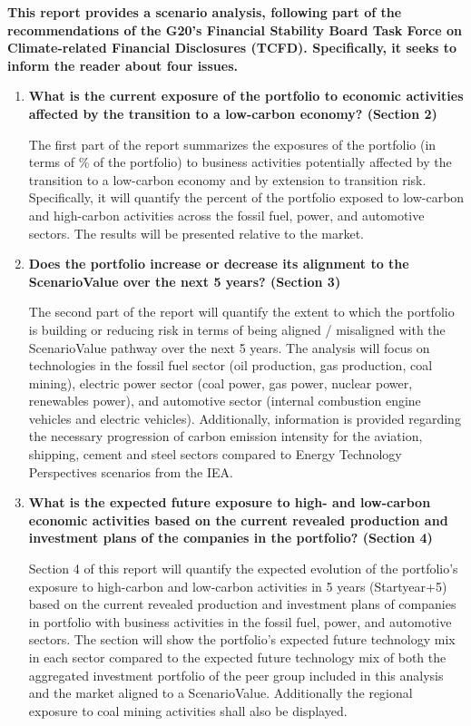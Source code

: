 \documentclass[10pt,table]{article}\usepackage[]{graphicx}\usepackage[]{color}
\begin{document}
	\begin{multicols}{2}

		\textbf{This report provides a scenario analysis, following part of the recommendations of the G20's Financial Stability Board Task Force on Climate-related Financial Disclosures (TCFD). Specifically, it seeks to inform the reader about four issues.}

		\begin{enumerate}
			\item{\textbf{What is the current exposure of the portfolio to economic activities affected by the transition to a low-carbon economy? (Section 2) }
			}

			The first part of the report summarizes the exposures of the portfolio (in terms of \% of the portfolio) to business activities potentially affected by the transition to a low-carbon economy and by extension to transition risk. Specifically, it will quantify the percent of the portfolio exposed to low-carbon and high-carbon activities across the fossil fuel, power, and automotive sectors. The results will be presented relative to the market.

			\item{\textbf{Does the portfolio increase or decrease its alignment to the ScenarioValue over the next 5 years? (Section 3)}
			}

			The second part of the report will quantify the extent to which the portfolio is building or reducing risk in terms of being aligned / misaligned with the ScenarioValue pathway over the next 5 years. The analysis will focus on technologies in the fossil fuel sector (oil production, gas production, coal mining), electric power sector (coal power, gas power, nuclear power, renewables power), and automotive sector (internal combustion engine vehicles and electric vehicles). Additionally, information is provided regarding the necessary progression of carbon emission intensity for the aviation, shipping, cement and steel sectors compared to Energy Technology Perspectives scenarios from the IEA. 

			\item{\textbf{What is the expected future exposure to high- and low-carbon economic activities based on the current revealed production and investment plans of the companies in the portfolio? (Section 4)}
			}

			Section 4 of this report will quantify the expected evolution of the portfolio's exposure to high-carbon and low-carbon activities in 5 years (Startyear+5) based on the current revealed production and investment plans of companies in portfolio with business activities in the fossil fuel, power, and automotive sectors. The section will show the portfolio's expected future technology mix in each sector compared to the expected future technology mix of both the aggregated investment portfolio of the peer group included in this analysis and the market aligned to a ScenarioValue. Additionally the regional exposure to coal mining activities shall also be displayed. 


\end{enumerate}
\end{multicols}
\end{document}
